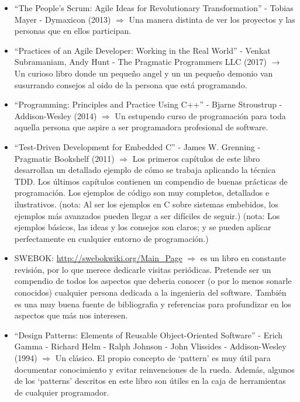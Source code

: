 \documentclass[spanish,12pt,a4paper,final,oneside]{book}
\begin{document}
\begin{itemize}
\item ``The People's Scrum: Agile Ideas for Revolutionary Transformation'' - Tobias Mayer - Dymaxicon (2013) $\Rightarrow$ Una manera distinta de ver los proyectos y las personas que en ellos participan. 

\item ``Practices of an Agile Developer: Working in the Real World'' - Venkat Subramaniam, Andy Hunt - The Pragmatic Programmers LLC (2017) $\rightarrow$ Un curioso libro donde un pequeño angel y un un pequeño demonio van susurrando consejos al oido de la persona que está programando.

\item ``Programming: Principles and Practice Using C++'' - Bjarne Stroustrup - Addison-Wesley (2014) $\Rightarrow$ Un estupendo curso de programación para toda aquella persona que aspire a ser programadora profesional de software. 

\item ``Test-Driven Development for Embedded C'' - James W. Grenning - Pragmatic Bookshelf (2011) $\Rightarrow$ Los primeros capítulos de este libro desarrollan un detallado ejemplo de cómo se trabaja aplicando la técnica TDD. Los últimos capítulos contienen un compendio de buenas prácticas de programación. Los ejemplos de código son muy completos, detallados e ilustrativos. (nota: Al ser los ejemplos en C sobre sistemas embebidos, los ejemplos más avanzados pueden llegar a ser difíciles de seguir.) (nota: Los ejemplos básicos, las ideas y los consejos son claros; y se pueden aplicar perfectamente en cualquier entorno de programación.)

\item SWEBOK:  \url{http://swebokwiki.org/Main_Page} $\Rightarrow$ es un libro en constante revisión, por lo que merece dedicarle visitas periódicas. Pretende ser un compendio de todos los aspectos que deberia conocer (o por lo menos sonarle conocidos) cualquier persona dedicada a la ingenieria del software. También es una muy buena fuente de bibliografia y referencias para profundizar en los aspectos que más nos interesen.

\item ``Design Patterns: Elements of Reusable Object-Oriented Software'' - Erich Gamma - Richard Helm - Ralph Johnson - John Vlissides - Addison-Wesley (1994)  $\Rightarrow$ Un clásico. El propio concepto de ‘pattern’ es muy útil para documentar conocimiento y evitar reinvenciones de la rueda. Además, algunos de los ‘patterns’ descritos en este libro son útiles en la caja de herramientas de cualquier programador.


\end{itemize}
\end{document}
